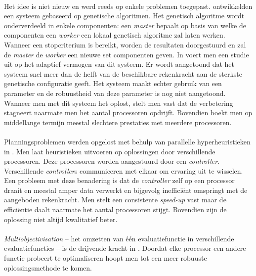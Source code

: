 \paragraph{}
Het idee is niet nieuw en werd reeds op enkele problemen toegepast. \cite{conf/gecco/LeonMS08,conf/pdp/SeguraSL12} ontwikkelden een systeem gebaseerd op genetische algoritmen. Het genetisch algoritme wordt onderverdeeld in enkele componenten: een \emph{master} bepaalt op basis van welke de componenten een \emph{worker} een lokaal genetisch algoritme zal laten werken. Wanneer een stopcriterium is bereikt, worden de resultaten doorgestuurd en zal de \emph{master} de \emph{worker} een nieuwe set componenten geven. In \cite{conf/pdp/SeguraSL12} voert men een studie uit op het adaptief vermogen van dit systeem. Er wordt aangetoond dat het systeem snel meer dan de helft van de beschikbare rekenkracht aan de sterkste genetische configuratie geeft. Het systeem maakt echter gebruik van een parameter en de robuustheid van deze parameter is nog niet aangetoond. Wanneer men met dit systeem het  oplost, stelt men vast dat de verbetering stagneert naarmate men het aantal processoren opdrijft. Bovendien boekt men op middellange termijn meestal slechtere prestaties met meerdere processoren.

\paragraph{}
Planningsproblemen werden opgelost met behulp van parallelle hyperheuristieken in \cite{Rattadilok04adistributed}. Men laat heuristieken uitvoeren op oplossingen door verschillende processoren. Deze processoren worden aangestuurd door een \emph{controller}. Verschillende \emph{controller}s communiceren met elkaar om ervaring uit te wisselen. Een probleem met deze benadering is dat de \emph{controller} zelf op een processor draait en meestal amper data verwerkt en bijgevolg ineffici\"ent omspringt met de aangeboden rekenkracht. Men stelt een consistente \emph{speed-up} vast maar de effici\"entie daalt naarmate het aantal processoren stijgt. Bovendien zijn de oplossing niet altijd kwalitatief beter.

\paragraph{}
\emph{Multiobjectivisation} -- het omzetten van \'e\'en evaluatiefunctie in verschillende evaluatiefuncties -- is de drijvende kracht in \cite{Luna08usinga}. Doordat elke processor een andere functie probeert te optimaliseren hoopt men tot een meer robuuste oplossingsmethode te komen.